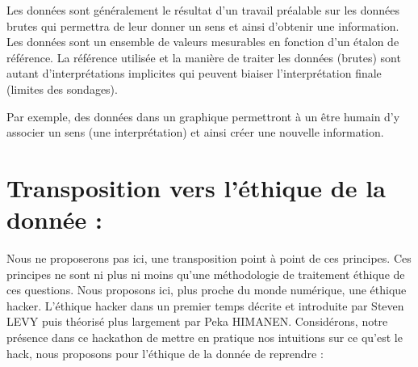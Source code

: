 \documentclass[a4paper,12pt]{article}
\begin{document}
Les données sont généralement le résultat d'un travail préalable sur les données brutes qui permettra de leur donner un sens et ainsi d'obtenir une information. Les données sont un ensemble de valeurs mesurables en fonction d'un étalon de référence. La référence utilisée et la manière de traiter les données (brutes) sont autant d’interprétations implicites qui peuvent biaiser l’interprétation finale (limites des sondages).

Par exemple, des données dans un graphique permettront à un être humain d'y associer un sens (une interprétation) et ainsi créer une nouvelle information.

\section{Transposition vers l'éthique de la donnée : }
Nous ne proposerons pas ici, une transposition point à point de ces principes. Ces principes ne sont ni plus ni moins qu'une méthodologie de traitement éthique de ces questions. 
Nous proposons ici, plus proche du monde numérique, une éthique hacker. L'éthique hacker dans un premier temps décrite et introduite par Steven LEVY puis théorisé plus largement par Peka HIMANEN. Considérons, notre présence dans ce hackathon de mettre en pratique nos intuitions sur ce qu'est le hack, nous proposons pour l'éthique de la donnée de reprendre :
\end{document}
